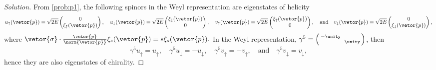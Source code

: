 \begin{proof}[Solution]
   From \cref{prob:p1}, the following spinors in the Weyl representation are eigenstates of helicity
   \begin{equation*}
      u_{\uparrow}(\vetor{p}) = \sqrt{2E} \begin{pmatrix}
         0\\
         \xi_\uparrow(\vetor{p})
      \end{pmatrix},\quad
      u_{\downarrow}(\vetor{p}) = \sqrt{2E} \begin{pmatrix}
         \xi_\downarrow(\vetor{p})\\
         0
      \end{pmatrix},\quad
      v_{\uparrow}(\vetor{p}) = \sqrt{2E} \begin{pmatrix}
         \xi_\uparrow(\vetor{p})\\
         0
      \end{pmatrix},\quad\text{and}\quad
      v_{\downarrow}(\vetor{p}) = \sqrt{2E} \begin{pmatrix}
         0\\
         \xi_\downarrow(\vetor{p})
      \end{pmatrix},
   \end{equation*}
   where \(\vetor{\sigma} \cdot \frac{\vetor{p}}{\norm{\vetor{p}}}\xi_s(\vetor{p}) = s \xi_s(\vetor{p}).\) In the Weyl representation, \(\gamma^5 = \left(\begin{smallmatrix} - \unity &&\\ && \unity \end{smallmatrix}\right)\), then
   \begin{equation*}
      \gamma^5 u_{\uparrow} = u_{\uparrow},\quad
      \gamma^5 u_{\downarrow} = - u_{\downarrow},\quad
      \gamma^5 v_{\uparrow} = -v_{\uparrow},\quad\text{and}\quad
      \gamma^5 v_{\downarrow} = v_{\downarrow},
   \end{equation*}
   hence they are also eigenstates of chirality.


\end{proof}
